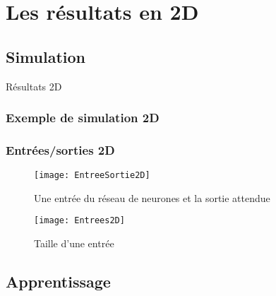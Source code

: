

% 

\section{Les résultats en 2D}

\subsection{Simulation}
\begin{frame}
    \large
    \centering
    Résultats 2D
\end{frame}

\begin{frame}[fragile]
    \frametitle{Exemple de simulation 2D}
  \begin{center}
  \end{center}
\end{frame}

\begin{frame}[fragile]
    \frametitle{Entrées/sorties 2D}

        \begin{figure}
        \texttt{[image: EntreeSortie2D]}       
        \caption{Une entrée du réseau de neurones et la sortie attendue}
        \end{figure}
        \begin{figure}
        \texttt{[image: Entrees2D]}       
        \caption{Taille d'une entrée}
        \end{figure}

\end{frame}

\subsection{Apprentissage}

